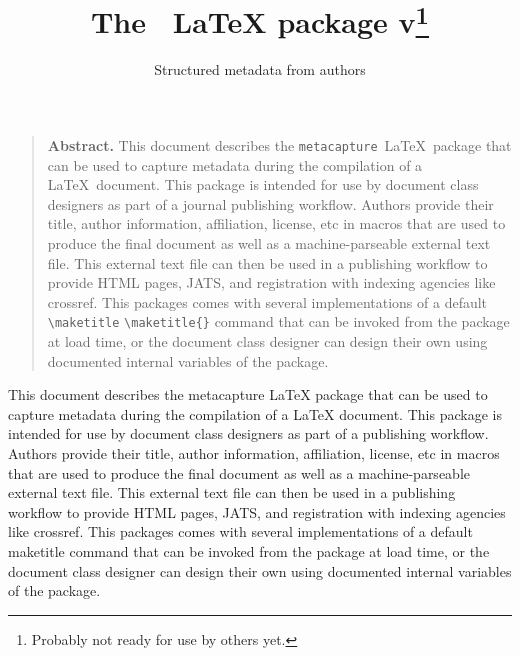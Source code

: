 \documentclass{article}
\title[plaintext={The metacapture LaTeX package},
       running={The \pkgname\ \LaTeX\ package v\pkgversion},
      ]{The \pkgname\ \textrm{\LaTeX} package v\pkgversion\footnote{Probably not ready for use by others yet.}}
\subtitle[plaintext={Structured metadata from authors}]{Structured metadata from authors}
\newcommand{\pkgname}{\texttt{metacapture}}
\newcommand{\cmd}[2][]{%
  \def\FirstArg{#1}%
  \ifx\FirstArg\empty%
    \texttt{\textbackslash{}#2}%
  \else%
    \texttt{\textbackslash{}#2\{#1\}}%
  \fi
}
\begin{document}
\hypersetup{colorlinks=true}
\maketitle
\renewenvironment{abstract}{\begin{quote}\noindent\textbf{\textsf{Abstract.}}}{\end{quote}}
\begin{abstract}
  This document describes the \pkgname\ \LaTeX\ package that can
  be used to capture metadata during the compilation of a \LaTeX\
  document. This package is intended for use by document class
  designers as part of a journal publishing workflow. Authors provide their
  title, author information, affiliation, license, etc in macros that
  are used to produce the final document as well as a
  machine-parseable external text file.  This external text file can
  then be used in a publishing workflow to provide HTML pages, JATS, and
  registration with indexing agencies like crossref. This packages comes with
  several implementations of a default \cmd{maketitle} command that
  can be invoked from the package at load time, or the document class
  designer can design their own using documented internal variables of
  the package.
\end{abstract}
\begin{textabstract}
  This document describes the metacapture LaTeX package that can
  be used to capture metadata during the compilation of a LaTeX
  document. This package is intended for use by document class
  designers as part of a publishing workflow. Authors provide their
  title, author information, affiliation, license, etc in macros that
  are used to produce the final document as well as a
  machine-parseable external text file.  This external text file can
  then be used in a publishing workflow to provide HTML pages, JATS, and
  registration with indexing agencies like crossref. This packages comes with
  several implementations of a default maketitle command that
  can be invoked from the package at load time, or the document class
  designer can design their own using documented internal variables of
  the package.
\end{textabstract}

\end{document}
